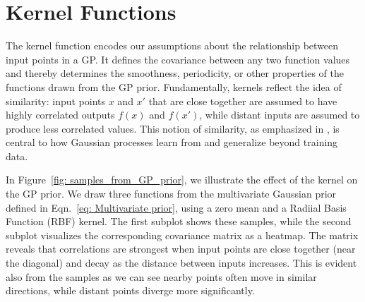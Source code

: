 \documentclass{ucdgradtaughtthesis}
\begin{document}
\section{Kernel Functions}
\label{sec: Kernels}
The kernel function encodes our assumptions about the relationship between input points in a GP.
It defines the covariance between any two function values and thereby determines the smoothness, periodicity, or other properties of the functions drawn from the GP prior.
Fundamentally, kernels reflect the idea of similarity: input points \( x \) and \( x' \) that are close together are assumed to have highly correlated outputs \( f(x) \) and \( f(x') \),
while distant inputs are assumed to produce less correlated values. This notion of similarity, as emphasized in \cite[Ch.~4]{bible}, is central to how Gaussian processes learn from and generalize beyond training data.
%

In Figure~\ref{fig: samples_from_GP_prior}, we illustrate the effect of the kernel on the GP prior.
We draw three functions from the multivariate Gaussian prior defined in Eqn.~\ref{eq: Multivariate prior}, using a zero mean and a Radiial Basis Function (RBF) kernel.
The first subplot shows these samples, while the second subplot visualizes the corresponding covariance matrix as a heatmap.
The matrix reveals that correlations are strongest when input points are close together (near the diagonal) and decay as the distance between inputs increases.
This is evident also from the samples as we can see nearby points often move in similar directions, while distant points diverge more significantly.
%
\end{document}
